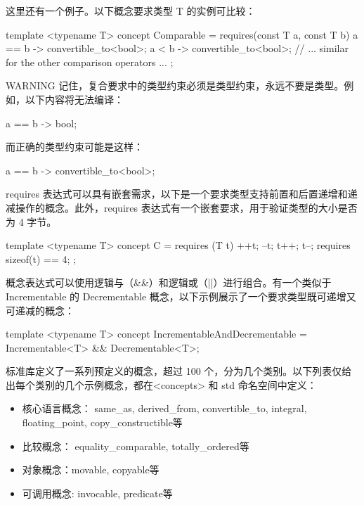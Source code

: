 这里还有一个例子。以下概念要求类型 T 的实例可比较：

\begin{cpp}
template <typename T>
concept Comparable = requires(const T a, const T b) {
    { a == b } -> convertible_to<bool>;
    { a < b } -> convertible_to<bool>;
    // ... similar for the other comparison operators ...
};
\end{cpp}

\begin{myWarning}{WARNING}
记住，复合要求中的类型约束必须是类型约束，永远不要是类型。例如，以下内容将无法编译：

\begin{cpp}
{ a == b } -> bool;
\end{cpp}

而正确的类型约束可能是这样：

\begin{cpp}
{ a == b } -> convertible_to<bool>;
\end{cpp}
\end{myWarning}


requires 表达式可以具有嵌套需求，以下是一个要求类型支持前置和后置递增和递减操作的概念。此外，requires 表达式有一个嵌套要求，用于验证类型的大小是否为 4 字节。

\begin{cpp}
template <typename T>
concept C = requires (T t) {
    ++t; --t; t++; t--;
    requires sizeof(t) == 4;
};
\end{cpp}


概念表达式可以使用逻辑与（\&\&）和逻辑或（||）进行组合。有一个类似于 Incrementable 的 Decrementable 概念，以下示例展示了一个要求类型既可递增又可递减的概念：

\begin{cpp}
template <typename T>
concept IncrementableAndDecrementable = Incrementable<T> && Decrementable<T>;
\end{cpp}


标准库定义了一系列预定义的概念，超过 100 个，分为几个类别。以下列表仅给出每个类别的几个示例概念，都在<concepts>  和 std 命名空间中定义：

\begin{itemize}
\item
核心语言概念： same\_as, derived\_from, convertible\_to, integral, floating\_point, copy\_constructible等

\item
比较概念： equality\_comparable, totally\_ordered等

\item
对象概念：movable, copyable等

\item
可调用概念: invocable, predicate等
\end{itemize}

